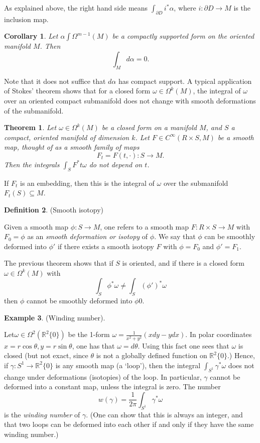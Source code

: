 \documentclass{article}
\newtheorem{theorem}{Theorem}[section]
\newtheorem{corollary}{Corollary}[theorem]
\theoremstyle{definition}
\newtheorem{defn}[theorem]{Definition}
\newtheorem{example}[theorem]{Example}
\newenvironment{definition}
  {\vspace{8pt}\begin{mdframed}[backgroundcolor=blueish,innertopmargin=4]\begin{defn}}
  {\end{defn}\end{mdframed}\vspace{4pt}}
\begin{document}
As explained above, the right hand side means $\int_{\partial D} i^* \alpha $, where $i : \partial D \rightarrow M$ is the inclusion map.

\begin{corollary}
Let $\alpha \int \Omega^{m-1}(M)$ be a compactly supported form on the oriented manifold $M$. Then
\[ 
    \int_M d\alpha = 0.
\]
\end{corollary}

Note that it does not suffice that $d\alpha$ has compact support. A typical application of Stokes’ theorem shows that for a closed form $\omega \in \Omega^k (M)$, the integral of $\omega$ over an oriented compact submanifold does not change with smooth deformations of the submanifold.

\begin{theorem}

Let $\omega \in \Omega^k (M)$ be a closed form on a manifold $M$, and $S$ a compact, oriented manifold of dimension $k$. Let $F \in C^\infty(R\times S,M)$ be a smooth map, thought of as a smooth family of maps 
\[
F_t = F(t, \cdot) : S \rightarrow M.
\]
Then the integrals $\int_S F^* t \omega$ do not depend on $t$.
\end{theorem}

If $F_t$ is an embedding, then this is the integral of $\omega$ over the submanifold $F_t(S) \subseteq M$.

\begin{definition} (Smooth isotopy)

Given a smooth map $\phi : S \rightarrow M$, one refers to a smooth map $F : R \times S \rightarrow M$ with $F_0 = \phi $ as an \textit{smooth deformation or isotopy} of $\phi$. We say that $\phi$ can be smoothly deformed into $\phi'$ if there exists a smooth isotopy $F$ with $\phi = F_0$ and $\phi' = F_1$. 
\end{definition}

The previous theorem shows that if $S$ is oriented, and if there is a closed form $\omega \in \Omega^k (M)$ with
\[
 \int_S \phi^* \omega \neq \int_S (\phi' )^* \omega 
\]
then $\phi$ cannot be smoothly deformed into $\phi 0$.


\begin{example} (Winding number). 

Let$ \omega \in \Omega^2 (\mathbb R^2\{0\})$ be the 1-form $\omega = \frac{1}{x^2 +y^2} (xdy-ydx)$. In polar coordinates $x = r \cos\theta, y = r\sin\theta$, one has that $\omega = d\theta$. Using this fact one sees that $\omega$ is closed (but not exact, since $\theta$ is not a globally defined function on $\mathbb R^2\{0\}$.) Hence, if $\gamma : S^1 \rightarrow \mathbb R^2 \{0\}$ is any smooth map (a ‘loop’), then the integral $\int_{S^1} \gamma^*\omega$ does not change under deformations (isotopies) of the loop. In particular, $\gamma$ cannot be deformed into a constant map, unless the integral is zero. The number 
\[ 
    w(\gamma) = \frac{1}{2\pi} \int_{S^1} \gamma^*\omega
\]
is the \textit{winding number} of $\gamma$. (One can show that this is always an integer, and that two loops can be deformed into each other if and only if they have the same winding number.)

\end{example}
\end{document}
